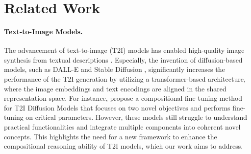 \section{Related Work}
\paragraph{\textbf{Text-to-Image Models.}}
The advancement of text-to-image (T2I) models has enabled high-quality image synthesis from textual descriptions \citep{sohn2023styledrop, xue2024raphael, shi2024instantbooth, chen2024pixart}. Especially, the invention of diffusion-based models, such as DALL-E \citep{dalle} and Stable Diffusion \citep{stabled}, significantly increases the performance of the T2I generation by utilizing a transformer-based architecture, where the image embeddings and text encodings are aligned in the shared representation space. For instance, \citet{bao2024separateandenhancecompositionalfinetuningtext2image} propose a compositional fine-tuning method for T2I Diffusion Models that focuses on two novel objectives and performs fine-tuning on critical parameters. However, these models still struggle to understand practical functionalities and integrate multiple components into coherent novel concepts. This highlights the need for a new framework to enhance the compositional reasoning ability of T2I models, which our work aims to address.


